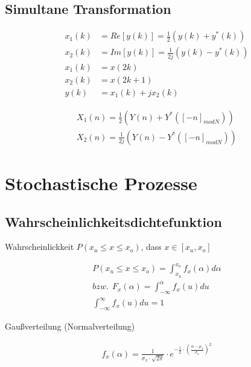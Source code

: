 \documentclass[10pt,a4paper]{article}
\begin{document}
  \subsection{Simultane Transformation}
  \begin{mdframed}[style=exercise]
    \begin{align}
        x_1(k) &= Re[y(k)] = \frac{1}{2}(y(k)+y^*(k))\\
        x_2(k) &= Im[y(k)] = \frac{1}{2j}(y(k)-y^*(k))\\
        x_1(k) &= x(2k)\\
        x_2(k) &= x(2k+1)\\
        y(k) &= x_1(k) +jx_2(k)
    \end{align}
  \end{mdframed}
  \begin{mdframed}[style=exercise]
    \begin{align}
        X_1(n) = \frac{1}{2}(Y(n)+Y^*([-n]_{modN}))\\
        X_2(n) = \frac{1}{2j}(Y(n)-Y^*([-n]_{modN}))
    \end{align}
  \end{mdframed}

\section{Stochastische Prozesse}
\subsection{Wahrscheinlichkeitsdichtefunktion}
Wahrscheinlickkeit $P(x_u \leq x \leq x_o )$, dass $x \in [x_u,x_o]$ 
  \begin{mdframed}[style=exercise]
    \begin{align}
        P(x_u \leq x \leq x_o ) = \displaystyle\int_{x_u}^{x_o} f_x(\alpha) d\alpha \\
        bzw. \ \ F_x(\alpha) = \displaystyle\int_{-\infty}^{\alpha} f_x(u)du\\
        \displaystyle\int_{-\infty}^{\infty} f_x(u)du = 1
    \end{align}
  \end{mdframed}
Gaußverteilung (Normalverteilung)
  \begin{mdframed}[style=exercise]
    \begin{align}
        f_x(\alpha) = \frac{1}{\sigma_x \cdot \sqrt{2\pi}} \cdot e^{-\frac{1}{2} \cdot \left( \frac{\alpha - \mu_x}{\sigma_x}\right)^2}
    \end{align}
  \end{mdframed}
\end{document}
